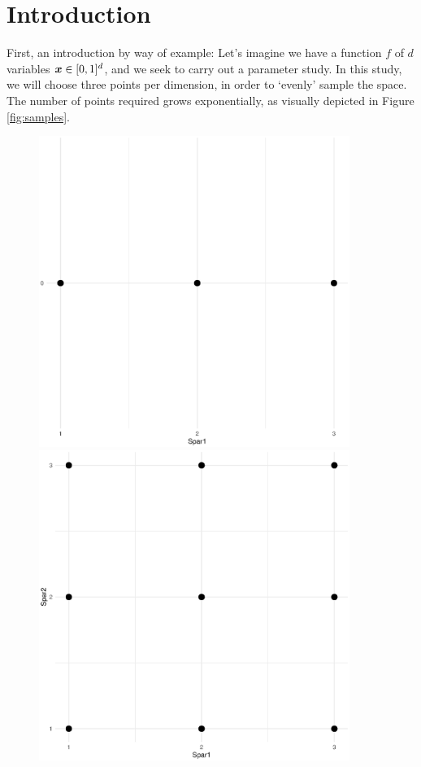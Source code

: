 \documentclass{article}
\begin{document}
\section{Introduction}
First, an introduction by way of example: Let's imagine we have a function $f$
of $d$ variables $\boldsymbol{x}\in[0,1]^d$, and we seek to carry out a parameter study. In
this study, we will choose three points per dimension, in order to `evenly'
sample the space. The number of points required grows exponentially,
as visually depicted in Figure \ref{fig:samples}.

\begin{figure}[!ht]
  \centering
  \begin{minipage}{0.45\textwidth}
    \includegraphics[width=0.9\textwidth]{../../images/points1}
  \end{minipage} %
  \begin{minipage}{0.45\textwidth}
    \includegraphics[width=0.9\textwidth]{../../images/points2}

\end{minipage}
\end{figure}
\end{document}
